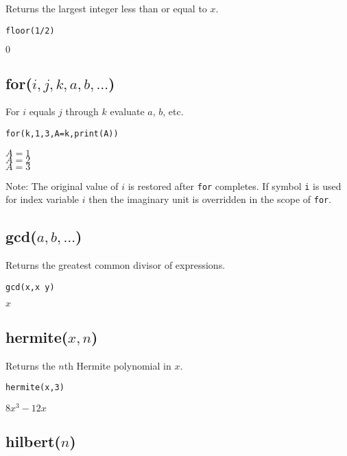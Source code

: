 Returns the largest integer less than or equal to $x$.

{\color{blue}
\begin{verbatim}
floor(1/2)
\end{verbatim}
}

\noindent
$0$

\subsection*{for($i,j,k,a,b,\ldots$)}

For $i$ equals $j$ through $k$ evaluate $a$, $b$, etc.

{\color{blue}
\begin{verbatim}
for(k,1,3,A=k,print(A))
\end{verbatim}
}

\noindent
$A=1$\\
$A=2$\\
$A=3$

\bigskip
\noindent
Note: The original value of $i$ is restored after {\tt for} completes.
If symbol {\tt i} is used for index variable $i$
then the imaginary unit is overridden in the scope of {\tt for}.

\subsection*{gcd($a,b,\ldots$)}

Returns the greatest common divisor of expressions.

{\color{blue}
\begin{verbatim}
gcd(x,x y)
\end{verbatim}
}

\noindent
$x$

\subsection*{hermite($x,n$)}

Returns the $n$th Hermite polynomial in $x$.

{\color{blue}
\begin{verbatim}
hermite(x,3)
\end{verbatim}
}

\noindent
$\displaystyle 8x^3-12x$


\subsection*{hilbert($n$)}

